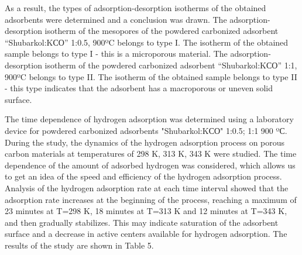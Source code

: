 \begin{multicols}{2}
As a result, the types of adsorption-desorption isotherms of the
obtained adsorbents were determined and a conclusion was drawn. The
adsorption-desorption isotherm of the mesopores of the powdered
carbonized adsorbent ``Shubarkol:KСО''
1:0.5, 900ºC belongs to type I. The isotherm of the obtained sample
belongs to type I - this is a microporous material. The
adsorption-desorption isotherm of the powdered carbonized adsorbent
``Shubarkol:KСО'' 1:1, 900ºC belongs
to type II. The isotherm of the obtained sample belongs to type II -
this type indicates that the adsorbent has a macroporous or uneven solid
surface.

The time dependence of hydrogen adsorption was determined using a
laboratory device for powdered carbonized adsorbents
"Shubarkol:KСО" 1:0.5; 1:1 900 ºС.
During the study, the dynamics of the hydrogen adsorption process on
porous carbon materials at temperatures of 298 K, 313 K, 343 K were
studied. The time dependence of the amount of adsorbed hydrogen was
considered, which allows us to get an idea of
\hspace{0pt}\hspace{0pt}the speed and efficiency of the hydrogen
adsorption process. Analysis of the hydrogen adsorption rate at each
time interval showed that the adsorption rate increases at the beginning
of the process, reaching a maximum of 23 minutes at T=298 K, 18 minutes
at T=313 K and 12 minutes at T=343 K, and then gradually stabilizes.
This may indicate saturation of the adsorbent surface and a decrease in
active centers available for hydrogen adsorption. The results of the
study are shown in Table 5.
\end{multicols}



